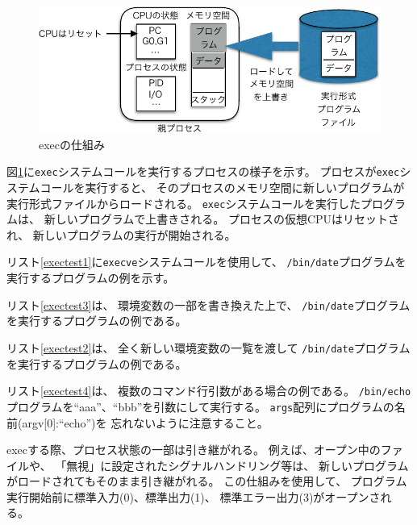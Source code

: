\documentclass[a4j,dvipdfmx]{jarticle}
\begin{document}
\begin{enumerate}
\begin{enumerate}
\begin{figure}[hbtp]
\begin{center}
\includegraphics[scale=0.8]{exec-crop.pdf}
\caption{execの仕組み}
\label{fig_exec}
\end{center}
\end{figure}

図\ref{fig_exec}に\verb/exec/システムコールを実行するプロセスの様子を示す。
プロセスが\verb/exec/システムコールを実行すると、
そのプロセスのメモリ空間に新しいプログラムが実行形式ファイルからロードされる。
\verb/exec/システムコールを実行したプログラムは、
新しいプログラムで上書きされる。
プロセスの仮想CPUはリセットされ、
新しいプログラムの実行が開始される。

リスト\ref{exectest1}に\verb;execve;システムコールを使用して、
\verb;/bin/date;プログラムを実行するプログラムの例を示す。



リスト\ref{exectest3}は、
環境変数の一部を書き換えた上で、
\verb;/bin/date;プログラムを実行するプログラムの例である。



リスト\ref{exectest2}は、
全く新しい環境変数の一覧を渡して
\verb;/bin/date;プログラムを実行するプログラムの例である。



リスト\ref{exectest4}は、
複数のコマンド行引数がある場合の例である。
\verb;/bin/echo;プログラムを``aaa''、``bbb''を引数にして実行する。
\verb;args;配列にプログラムの名前(argv[0]:``echo'')を
忘れないように注意すること。



execする際、プロセス状態の一部は引き継がれる。
例えば、オープン中のファイルや、
「無視」に設定されたシグナルハンドリング等は、
新しいプログラムがロードされてもそのまま引き継がれる。
この仕組みを使用して、
プログラム実行開始前に標準入力(0)、標準出力(1)、
標準エラー出力(3)がオープンされる。


\end{enumerate}
\end{enumerate}
\end{document}
